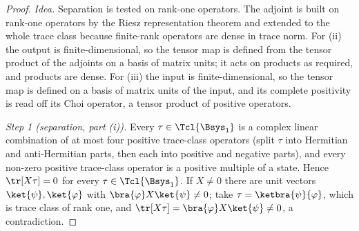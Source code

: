 \begin{proof}
\emph{Idea.} Separation is tested on rank-one operators. The adjoint is built
on rank-one operators by the Riesz representation theorem and extended to the
whole trace class because finite-rank operators are dense in trace norm. For
(ii) the output is finite-dimensional, so the tensor map is defined from the
tensor product of the adjoints on a basis of matrix units; it acts on products
as required, and products are dense. For (iii) the input is
finite-dimensional, so the tensor map is defined on a basis of matrix units
of the input, and its complete positivity is read off its Choi operator, a
tensor product of positive operators.

\emph{Step 1 (separation, part (i)).} Every $\tau\in\Tcl{\Bsys_1}$ is a
complex linear combination of at most four positive trace-class operators
(split $\tau$ into Hermitian and anti-Hermitian parts, then each into positive
and negative parts), and every non-zero positive trace-class operator is a
positive multiple of a state. Hence $\tr[X\tau]=0$ for every
$\tau\in\Tcl{\Bsys_1}$. If $X\ne0$ there are unit vectors
$\ket{\psi},\ket{\varphi}$ with $\bra{\varphi}X\ket{\psi}\ne0$; take
$\tau=\ketbra{\psi}{\varphi}$, which is trace class of rank one, and
$\tr[X\tau]=\bra{\varphi}X\ket{\psi}\ne0$, a contradiction.


\end{proof}
